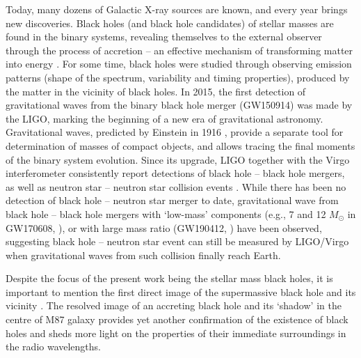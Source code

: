 Today, many dozens of Galactic X-ray sources are known, and every year brings new discoveries.
Black holes (and black hole candidates) of stellar masses are found in the binary systems, revealing themselves to the external observer through the process of accretion -- an effective mechanism of transforming matter into energy \citep{AccretionPower}.
For some time, black holes were studied through observing emission patterns (shape of the spectrum, variability and timing properties), produced by the matter in the vicinity of black holes.
In 2015, the first detection of gravitational waves from the binary black hole merger (GW150914) was made by the \gls{LIGO}, marking the beginning of a new era of gravitational astronomy. 
Gravitational waves, predicted by Einstein in 1916 \citep{Einstein1916}, provide a separate tool for determination of masses of compact objects, and allows tracing the final moments of the binary system evolution.
Since its upgrade, \gls{LIGO} together with the Virgo interferometer consistently report detections of black hole -- black hole mergers, as well as neutron star -- neutron star collision events \citep[GW170817,][]{Abbott2017}.
While there has been no detection of black hole -- neutron star merger to date, gravitational wave from black hole -- black hole mergers with `low-mass' components (e.g., 7 and 12 $M_\odot$ in GW170608, \citealt{Abbott2017b}), or with large mass ratio (GW190412, \citealt{Abbott2020a}) have been observed, suggesting black hole -- neutron star event can still be measured by \gls{LIGO}/Virgo when gravitational waves from such collision finally reach Earth.

Despite the focus of the present work being the stellar mass black holes, it is important to mention the first direct image of the supermassive black hole and its vicinity \citep{EHTC2019}.
The resolved image of an accreting black hole and its `shadow' in the centre of M87 galaxy provides yet another confirmation of the existence of black holes and sheds more light on the properties of their immediate surroundings in the radio wavelengths.


